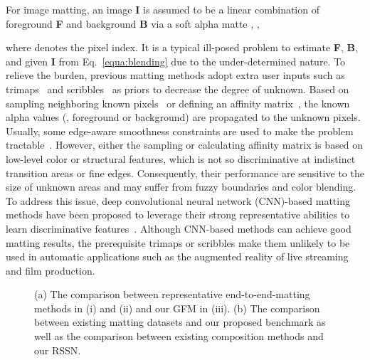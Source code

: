 \documentclass[twocolumn]{svjour3}
\begin{document}
For image matting, an image \textbf{I} is assumed to be a linear combination of foreground \textbf{F} and background \textbf{B} via a soft alpha matte , ,

where  denotes the pixel index. It is a typical ill-posed problem to estimate \textbf{F}, \textbf{B}, and  given \textbf{I} from Eq.~\eqref{equa:blending} due to the under-determined nature. To relieve the burden, previous matting methods adopt extra user inputs such as trimaps~\citep{xu2017deep} and scribbles~\citep{levin2007closed} as priors to decrease the degree of unknown. Based on sampling neighboring known pixels~\citep{wang2007optimized,ruzon2000alpha,wang2005iterative} or defining an affinity matrix~\citep{zheng2008fuzzymatte}, the known alpha values (, foreground or background) are propagated to the unknown pixels. Usually, some edge-aware smoothness constraints are used to make the problem tractable~\citep{levin2007closed}. However, either the sampling or calculating affinity matrix is based on low-level color or structural features, which is not so discriminative at indistinct transition areas or fine edges. Consequently, their performance are sensitive to the size of unknown areas and may suffer from fuzzy boundaries and color blending. To address this issue, deep convolutional neural network (CNN)-based matting methods have been proposed\citep{xu2017deep,chen2018semantic,zhang2019late,Qiao_2020_CVPR,liu2020boosting,mgmatting} to leverage their strong representative abilities to learn discriminative features~\citep{zhang2020empowering}. Although CNN-based methods can achieve good matting results, the prerequisite trimaps or scribbles make them unlikely to be used in automatic applications such as the augmented reality of live streaming and film production. 

\begin{figure*}[!t]
\centering
{}
\hfil
{}
\caption{(a) The comparison between representative end-to-end-matting methods in (i) and (ii) and our GFM in (iii). (b) The comparison between existing matting datasets and our proposed benchmark as well as the comparison between existing composition methods and our RSSN.}
\label{fig:motivation}
\end{figure*}
\end{document}
